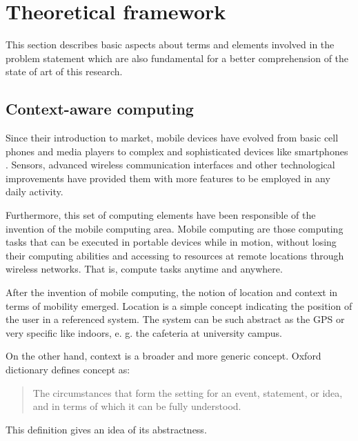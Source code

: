 \section{Theoretical framework} 
\label{sec:theoretical_framework}

This section describes basic aspects about terms and elements involved in the problem statement which are also fundamental for a better comprehension of the state of art of this research.

\subsection{Context-aware computing}
\label{sub:context_aware_computing}

Since their introduction to market, mobile devices have evolved from basic cell phones and media players to complex and sophisticated devices like smartphones \cite{Charlesworth2009,Schmidt2011}.
Sensors, advanced wireless communication interfaces and other technological improvements have provided them with more features to be employed in any daily activity.

Furthermore, this set of computing elements have been responsible of the invention of the mobile computing area.
Mobile computing are those computing tasks that can be executed in portable devices while in motion, without losing their computing abilities and accessing to resources at remote locations through wireless networks.
That is, compute tasks anytime and anywhere.

After the invention of mobile computing, the notion of location and context in terms of mobility emerged. 
Location is a simple concept indicating the position of the user in a referenced system. 
The system can be such abstract as the GPS or very specific like indoors, e. g. the cafeteria at university campus.

On the other hand, context is a broader and more generic concept.
Oxford dictionary defines concept as:
\begin{quotation}
  The circumstances that form the setting for an event, statement, or idea, and in terms of which it can be fully understood.
\end{quotation}
This definition gives an idea of its abstractness.

